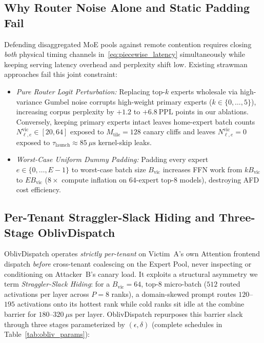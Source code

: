 \documentclass[10pt,journal,compsoc]{IEEEtran}
\def\OD{OblivDispatch}%
\theoremstyle{definition}
\theoremstyle{remark}
\newcommand{\OD}{\textsc{OblivDispatch}}
\begin{document}
\subsection{Why Router Noise Alone and Static Padding Fail}
Defending disaggregated MoE pools against remote contention requires closing \emph{both} physical timing channels in~\eqref{eq:piecewise_latency} simultaneously while keeping serving latency overhead and perplexity shift low. Existing strawman approaches fail this joint constraint:
\begin{itemize}
  \item \emph{Pure Router Logit Perturbation:} Replacing top-$k$ experts wholesale via high-variance Gumbel noise corrupts high-weight primary experts ($k \in \{0, \dots, 5\}$), increasing corpus perplexity by $+1.2$ to $+6.8~\mathrm{PPL}$ points in our ablations. Conversely, keeping primary experts intact leaves home-expert batch counts $N_{\ell, e}^{\mathrm{vic}} \in [20, 64]$ exposed to $M_{\mathrm{tile}} = 128$ canary cliffs and leaves $N_{\ell, e}^{\mathrm{vic}} = 0$ exposed to $\tau_{\mathrm{launch}} \approx 85~\mu\mathrm{s}$ kernel-skip leaks.
  \item \emph{Worst-Case Uniform Dummy Padding:} Padding every expert $e \in \{0, \dots, E-1\}$ to worst-case batch size $B_{\mathrm{vic}}$ increases FFN work from $k B_{\mathrm{vic}}$ to $E B_{\mathrm{vic}}$ ($8\times$ compute inflation on $64$-expert $\text{top-}8$ models), destroying AFD cost efficiency.
\end{itemize}

\subsection{Per-Tenant Straggler-Slack Hiding and Three-Stage OblivDispatch}
\OD{} operates \emph{strictly per-tenant} on Victim~A's own Attention frontend dispatch \emph{before} cross-tenant coalescing on the Expert Pool, never inspecting or conditioning on Attacker~B's canary load. It exploits a structural asymmetry we term \emph{Straggler-Slack Hiding}: for a $B_{\mathrm{vic}} = 64$, $\text{top-}8$ micro-batch ($512$ routed activations per layer across $P=8$ ranks), a domain-skewed prompt routes $120$--$195$ activations onto its hottest rank while cold ranks sit idle at the combine barrier for $180$--$320~\mu\mathrm{s}$ per layer. \OD{} repurposes this barrier slack through three stages parameterized by $(\epsilon, \delta)$ (complete schedules in Table~\ref{tab:obliv_params}):
\end{document}

